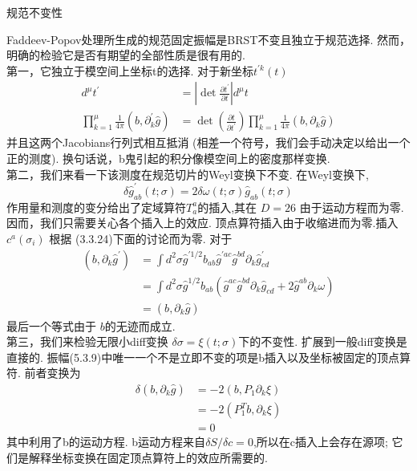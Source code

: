 \centerline{\Large 规范不变性}
Faddeev-Popov处理所生成的规范固定振幅是BRST不变且独立于规范选择. 然而，明确的检验它是否有期望的全部性质是很有用的. \\
第一，它独立于模空间上坐标t的选择. 对于新坐标$t^{\prime k}(t)$
\begin{equation}
	\begin{aligned}
		d^{\mu} t^{\prime} &=\left|\operatorname{det} \frac{\partial t^{\prime}}{\partial t}\right| d^{\mu} t \\
		\prod_{k=1}^{\mu} \frac{1}{4 \pi}\left(b, \partial_{k}^{\prime} \hat{g}\right) &=\operatorname{det}\left(\frac{\partial t}{\partial t^{\prime}}\right) \prod_{k=1}^{\mu} \frac{1}{4 \pi}\left(b, \partial_{k} \hat{g}\right)
	\end{aligned}
\end{equation}
并且这两个Jacobians行列式相互抵消 (相差一个符号，我们会手动决定以给出一个正的测度). 换句话说，b鬼引起的积分像模空间上的密度那样变换.\\
第二，我们来看一下该测度在规范切片的Weyl变换下不变. 在Weyl变换下,
\begin{equation}
	\delta \hat{g}_{a b}^{\prime}(t ; \sigma)=2 \delta \omega(t ; \sigma) \hat{g}_{a b}(t ; \sigma)
\end{equation}
作用量和测度的变分给出了定域算符$T_{a}^{a}$的插入,其在 $D=26$ 由于运动方程而为零. 因而，我们只需要关心各个插入上的效应. 顶点算符插入由于收缩进而为零.插入 $c^{a}\left(\sigma_{i}\right)$ 根据 (3.3.24)下面的讨论而为零. 对于
\begin{equation}
	\begin{aligned}
		\left(b, \partial_{k} \hat{g}^{\prime}\right) &=\int d^{2} \sigma \hat{g}^{\prime 1 / 2} b_{a b} \hat{g}^{\prime a c} \hat{g}^{b d} \partial_{k} \hat{g}_{c d}^{\prime} \\
		&=\int d^{2} \sigma \hat{g}^{1 / 2} b_{a b}\left(\hat{g}^{a c} \hat{g}^{b d} \partial_{k} \hat{g}_{c d}+2 \hat{g}^{a b} \partial_{k} \omega\right) \\
		&=\left(b, \partial_{k} \hat{g}\right)
	\end{aligned}
\end{equation}
最后一个等式由于 $b$的无迹而成立.\\
第三，我们来检验无限小diff变换 $\delta \sigma=\xi(t ; \sigma) $下的不变性.  扩展到一般diff变换是直接的. 振幅(5.3.9)中唯一一个不是立即不变的项是b插入以及坐标被固定的顶点算符. 前者变换为
\begin{equation}
	\begin{aligned}
		\delta\left(b, \partial_{k} \hat{g}\right) &=-2\left(b, P_{1} \partial_{k} \xi\right) \\
		&=-2\left(P_{1}^{T} b, \partial_{k} \xi\right) \\
		&=0
	\end{aligned}
\end{equation}
其中利用了b的运动方程. b运动方程来自$\delta S / \delta c=0$,所以在c插入上会存在源项; 它们是解释坐标变换在固定顶点算符上的效应所需要的.\\


